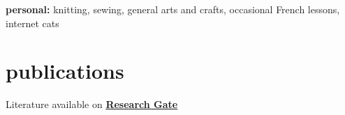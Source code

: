 \documentclass[]{cv} %
\begin{document}
\textbf{personal:} knitting, sewing, general arts and crafts, occasional French lessons, internet cats

\vfill
\section{publications}
{Literature available on 
\href{https://www.researchgate.net/profile/Helga_Ingimundardottir}{\textbf{Research
 Gate}}}
\nocite{*}







\printbibliography[type=misc, title={seminars}, heading=subbibliography]


\end{document}

